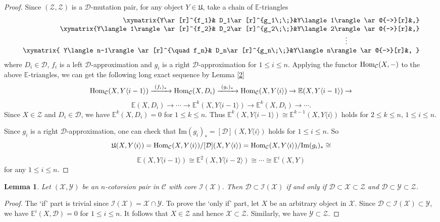 \documentclass[a4paper,reqno,11pt]{amsart}
\newtheorem{lemma}[theorem]{Lemma}
\theoremstyle{definition}
\def\C{\mathcal{C}}
\def\D{\mathcal{D}}
\def\X{\mathcal{X}}
\def\D{\mathcal{D}}
\def\Y{\mathcal{Y}}
\def\Z{\mathcal {Z}}
\def\I{\mathcal {I}}
\def\E{\mathbb{E}}
\def \text{\mbox}
\providecommand{\Hom}{\mathop{\rm Hom}\nolimits}%
\begin{document}
\begin{proof}
Since $(\Z, \Z)$ is a $\D$-mutation pair, for any object $Y\in\mathfrak{U}$, take a chain of $\E$-triangles
    $$\begin{array}{r}
     \xymatrix{Y\ar[r]^{f_1}& D_1\ar[r]^{g_1\;\;}&Y\langle1\rangle\ar@{-->}[r]&,}\\
     \xymatrix{Y\langle1\rangle\ar[r]^{f_2}& D_2\ar[r]^{g_2\;\;}&Y\langle2\rangle\ar@{-->}[r]&,}\\
\vdots\hspace{3.6cm}\\
    \xymatrix{
     Y\langle n-1\rangle\ar[r]^{\quad f_n}& D_n\ar[r]^{g_n\;\;}&Y\langle n\rangle\ar@{-->}[r]&,
     }
     \end{array}$$
where $D_i\in\D$, $f_i$ is a left $\D$-approximation and $g_i$ is a right $\D$-approximation for $1\leq i\leq n$. Applying the functor $\Hom_{\C}(X,-)$ to the above $\E$-triangles, we can get the following long exact sequence by Lemma \ref{2}
$$\Hom_{\C}(X,Y\langle i-1\rangle)\xrightarrow{~(f_i)_{\ast}~}\Hom_{\C}(X,D_i)\xrightarrow{~(g_i)_{\ast}~}\Hom_{\C}(X,Y\langle i\rangle)\rightarrow\E(X,Y\langle i-1\rangle)\rightarrow$$
$$\E(X,D_i)\rightarrow\cdots\rightarrow\E^k(X,Y\langle i-1\rangle)\rightarrow\E^k(X,D_i)\rightarrow\cdots.$$
Since $X\in\Z$ and $D_i\in\D$, we have $\E^k(X,D_i)=0$ for $1\leq k\leq n$. Thus $\E^k(X,Y\langle i-1\rangle)\cong\E^{k-1}(X,Y\langle i\rangle)$ holds for $2\leq k\leq n$, $1\leq i\leq n$.

Since $g_i$ is a right $\D$-approximation, one can check that Im$(g_i)_{\ast}=[\D](X,Y\langle i\rangle)$ holds for $1\leq i\leq n$. So
$$\mathfrak{U}(X,Y\langle i\rangle)=\Hom_{\C}(X,Y\langle i\rangle)/[\D](X,Y\langle i\rangle)=\Hom_{\C}(X,Y\langle i\rangle)/\text{Im}(g_i)_{\ast}\cong$$
$$\E(X,Y\langle i-1\rangle)\cong\E^2(X,Y\langle i-2\rangle)\cong\cdots\cong\E^i(X,Y)$$
 for any $1\leq i\leq n$.
\end{proof}
\begin{lemma}\label{b}
Let $(\X,\Y)$ be an $n$-cotorsion pair in $\C$ with core $\I(\X)$. Then $\D\subset\I(\X)$ if and only if $\D\subset\X\subset\Z$ and $\D\subset\Y\subset\Z$.
\end{lemma}
\begin{proof}
The `if' part is trivial since  $\I(\X)=\X\cap\Y$. To prove the `only if' part, let $X$ be an arbitrary object in $\X$. Since  $\D\subset\I(\X)\subset\Y$, we have $\E^i(X,\D)=0$  for $1\leq i\leq n$. It follows that $X\in\Z$ and hence $\X\subset\Z$. Similarly, we have $\Y\subset\Z$.
\end{proof}
\end{document}
